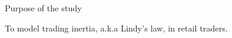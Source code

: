 \documentclass{beamer}
\begin{document}
\begin{frame}{Purpose of the study}


To model trading inertia, a.k.a Lindy's law, in retail traders.

%


\end{frame}
\end{document}
